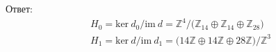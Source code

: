 		Ответ:
		\begin{gather*}
			H_0 = \text{ker}\: d_0 \slash \text{im}\: d = \mathbb{Z}^4 \slash \Big( \mathbb{Z}_{14} \oplus \mathbb{Z}_{14} \oplus \mathbb{Z}_{28} \Big)\\
			H_1 = \text{ker}\: d \slash \text{im}\: d_1 = \Big(14\mathbb{Z} \oplus 14\mathbb{Z} \oplus 28\mathbb{Z}\Big)\slash \mathbb{Z}^3
		\end{gather*}